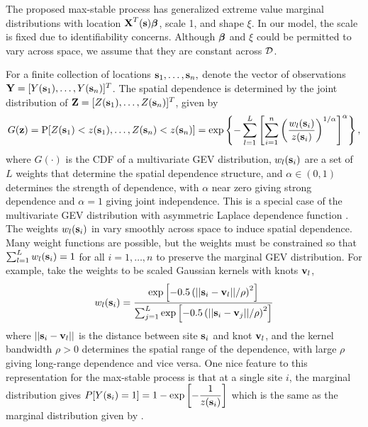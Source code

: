 \documentclass[11pt]{article}
\begin{document}



The proposed max-stable process has generalized extreme value marginal distributions with location $\mbox{\bf X}^T(\mbox{\bf s}) \mbox{\boldmath $\beta$}$, scale 1, and shape $\xi$.
In our model, the scale is fixed due to identifiability concerns.
Although $\mbox{\boldmath $\beta$}$ and $\xi$ could be permitted to vary across space, we assume that they are constant across ${\cal D}$.

For a finite collection of locations $\mbox{\bf s}_1, \ldots, \mbox{\bf s}_n,$ denote the vector of observations $\mbox{\bf Y} = [Y(\mbox{\bf s}_1), \ldots, Y(\mbox{\bf s}_n)]^T$.
The spatial dependence is determined by the joint distribution of $\mbox{\bf Z} = [Z(\mbox{\bf s}_1),\ldots, Z(\mbox{\bf s}_n)]^T$, given by
\begin{align}\label{rbeq:jointCDF}
  G(\mbox{\bf z}) = \mbox{P}[Z(\mbox{\bf s}_1) < z(\mbox{\bf s}_1), \ldots, Z(\mbox{\bf s}_n) < z(\mbox{\bf s}_n)] = \exp\left\{-\sum_{l=1}^L\left[\sum_{i=1}^n\left(\frac{w_{l}(\mbox{\bf s}_i)}{z(\mbox{\bf s}_i)}\right)^{1/\alpha}\right]^{\alpha}\right\},
\end{align}
where $G(\cdot)$ is the CDF of a multivariate GEV distribution, $w_{l}(\mbox{\bf s}_i)$ are a set of $L$ weights that determine the spatial dependence structure, and $\alpha\in(0,1)$ determines the strength of dependence, with $\alpha$ near zero giving strong dependence and $\alpha=1$ giving joint independence.
This is a special case of the multivariate GEV distribution with asymmetric Laplace dependence function \citep{Tawn1990}.
The weights $w_{l}(\mbox{\bf s}_i)$ in  vary smoothly across space to induce spatial dependence.
Many weight functions are possible, but the weights must be constrained so that $\sum_{l=1}^L w_{l}(\mbox{\bf s}_i)=1$ for all $i=1,\ldots,n$ to preserve the marginal GEV distribution.
For example, \cite{Reich2012} take the weights to be scaled Gaussian kernels with knots $\mbox{\bf v}_l$,
\begin{align}\label{rbeq:w}
   w_{l}(\mbox{\bf s}_i) = \frac{\exp\left[-0.5\left(||\mbox{\bf s}_i-\mbox{\bf v}_l||/\rho\right)^2\right]}
                 {\sum_{j=1}^L\exp\left[-0.5\left(||\mbox{\bf s}_i-\mbox{\bf v}_j||/\rho\right)^2\right]}
\end{align}
where $||\mbox{\bf s}_i - \mbox{\bf v}_l||$ is the distance between site $\mbox{\bf s}_i$ and knot $\mbox{\bf v}_l$, and the kernel bandwidth $\rho>0$ determines the spatial range of the dependence, with large $\rho$ giving long-range dependence and vice versa.
One nice feature to this representation for the max-stable process is that at a single site $i$, the marginal distribution gives \mbox{$P[Y(\mbox{\bf s}_i) = 1] = 1 - \exp\left[ -\displaystyle\frac{ 1 }{ z(\mbox{\bf s}_i)} \right]$} which is the same as the marginal distribution given by \citet{Wang2010}.
\end{document}
